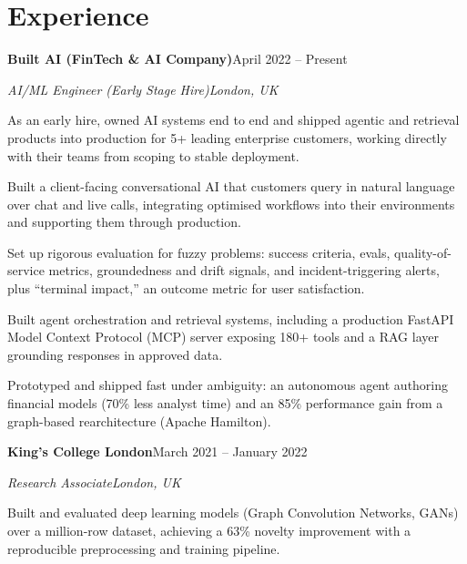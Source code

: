 \documentclass[10pt,a4paper]{article}
\newcommand{\entry}[4]{%
  {\color{company}\bfseries #1}\hfill {\color{muted}#2}\par
  \vspace{1pt}
  {\itshape #3}\hfill {\color{muted}\itshape #4}\par
  \vspace{3pt}%
}
\begin{document}
\section{Experience}
\entry{Built AI (FinTech \& AI Company)}{April 2022 -- Present}{AI/ML Engineer (Early Stage Hire)}{London, UK}
\begin{tight}
  \item As an early hire, owned AI systems end to end and shipped agentic and retrieval products into production for 5+ leading enterprise customers, working directly with their teams from scoping to stable deployment.
  \item Built a client-facing conversational AI that customers query in natural language over chat and live calls, integrating optimised workflows into their environments and supporting them through production.
  \item Set up rigorous evaluation for fuzzy problems: success criteria, evals, quality-of-service metrics, groundedness and drift signals, and incident-triggering alerts, plus ``terminal impact,'' an outcome metric for user satisfaction.
  \item Built agent orchestration and retrieval systems, including a production FastAPI Model Context Protocol (MCP) server exposing 180+ tools and a RAG layer grounding responses in approved data.
  \item Prototyped and shipped fast under ambiguity: an autonomous agent authoring financial models (70\% less analyst time) and an 85\% performance gain from a graph-based rearchitecture (Apache Hamilton).
\end{tight}

\entry{King's College London}{March 2021 -- January 2022}{Research Associate}{London, UK}
\begin{tight}
  \item Built and evaluated deep learning models (Graph Convolution Networks, GANs) over a million-row dataset, achieving a 63\% novelty improvement with a reproducible preprocessing and training pipeline.
\end{tight}

\end{document}
